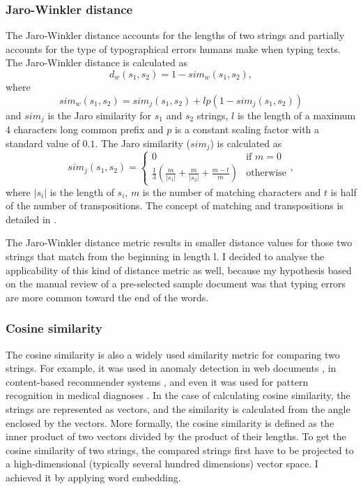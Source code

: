 \subsubsection*{Jaro-Winkler distance}

The Jaro-Winkler distance \cite{piskorski2007string} accounts for the lengths of two strings and partially accounts for the type of typographical errors humans make when typing texts. The Jaro-Winkler distance is calculated as
\begin{equation}
	d_w(s_1,s_2)=1-sim_w(s_1,s_2),
	\label{eq:winkler_d}
\end{equation}
where
\begin{equation}
	sim_w(s_1,s_2)=sim_j(s_1,s_2)+lp(1-sim_j(s_1,s_2))
	\label{eq:winkler_sim}
\end{equation}
and $sim_j$ is the Jaro similarity for $s_1$ and $s_2$ strings, $l$ is the length of a maximum 4 characters long common prefix and $p$ is a constant scaling factor with a standard value of $0.1$. The Jaro similarity ($sim_j$) is calculated as
\begin{equation}
	sim_j(s_1,s_2)=
	\begin{cases}
		0                                                                            & \text{if } m=0   \\
		\frac{1}{3} \left( \frac{m}{|s_1|} + \frac{m}{|s_2|} + \frac{m-t}{m} \right) & \text{otherwise} 
	\end{cases},
	\label{eq:jaro_sim}
\end{equation}
where $|s_i|$ is the length of $s_i$, $m$ is the number of matching characters and $t$ is half of the number of transpositions. The concept of matching and transpositions is detailed in \cite{piskorski2007string}.

The Jaro-Winkler distance metric results in smaller distance values for those two strings that match from the beginning in length l. I decided to analyse the applicability of this kind of distance metric as well, because my hypothesis based on the manual review of a pre-selected sample document was that typing errors are more common toward the end of the words.

\subsubsection*{Cosine similarity}

The cosine similarity is also a widely used similarity metric for comparing two strings. For example, it was used in anomaly detection in web documents \cite{friedman2007anomaly}, in content-based recommender systems \cite{zenebe2009representation}, and even it was used for pattern recognition in medical diagnoses \cite{ye2011cosine}. In the case of calculating cosine similarity, the strings are represented as vectors, and the similarity is calculated from the angle enclosed by the vectors. More formally, the cosine similarity is defined as the inner product of two vectors divided by the product of their lengths. To get the cosine similarity of two strings, the compared strings first have to be projected to a high-dimensional (typically several hundred dimensions) vector space. I achieved it by applying word embedding.

